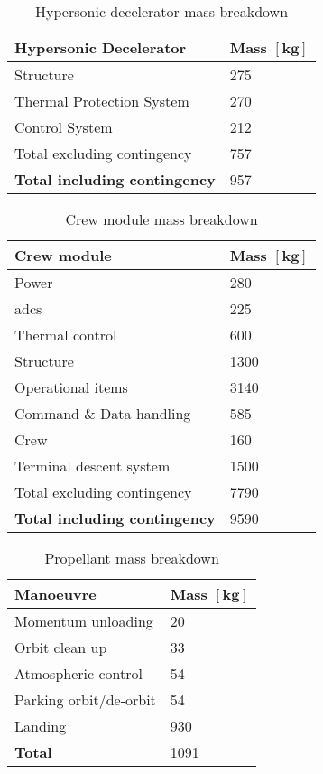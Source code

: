 \begin{table}[ht]
	\centering
	\caption{Hypersonic decelerator mass breakdown}
	\label{tab:DeceleratorMass}
	\begin{tabular}{|l|l|} \hline
		\textbf {Hypersonic Decelerator}             & \textbf{Mass $\mathbf{[kg]}$ } \\ \hline \hline
		Structure          &		 275       \\ \hline
		Thermal Protection System &		  270      \\ \hline
		Control System            		   &  212      \\ \hline \hline
		Total excluding contingency              	   &  757     \\ \hline
		\textbf {Total including contingency}                 &  957      \\ \hline
	\end{tabular}
\end{table}

\begin{table}[ht]
	\centering
	\caption{Crew module mass breakdown}
	\label{tab:CrewModuleMass}
	\begin{tabular}{|l|l|} \hline
		\textbf {Crew module}             & \textbf{Mass $\mathbf{[kg]}$ } \\ \hline \hline
		Power        &		 280       \\ \hline
		\gls{adcs} &		  225      \\ \hline
		Thermal control & 600\\ \hline
		Structure & 1300\\ \hline
		Operational items & 3140\\ \hline
		Command \& Data handling & 585 \\ \hline
		Crew & 160 \\ \hline
		Terminal descent system           		   &  1500      \\ \hline \hline
		Total excluding contingency              	   &  7790     \\ \hline
		\textbf {Total including contingency}                 &  9590      \\ \hline
	\end{tabular}
\end{table}

\begin{table}[ht]
	\centering
	\caption{Propellant mass breakdown}
	\label{tab:PropMass}
	\begin{tabular}{|l|l|} \hline
		\textbf {Manoeuvre}             & \textbf{Mass $\mathbf{[kg]}$ } \\ \hline \hline
		Momentum unloading       &		 20       \\ \hline
		Orbit clean up &		  33      \\ \hline
		Atmospheric control           		   &  54      \\ \hline 
		Parking orbit/de-orbit            	   & 54    \\ \hline
		Landing            	   &  930     \\ \hline \hline
		\textbf {Total}                 &  1091      \\ \hline
	\end{tabular}
\end{table}

